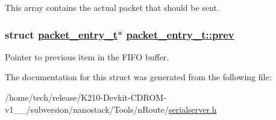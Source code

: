 This array contains the actual packet that should be sent. \hypertarget{structpacket__entry__t_bf2385bedd4ae2af115b923f29c8ec5d}{
\subsubsection[prev]{\setlength{\rightskip}{0pt plus 5cm}struct \hyperlink{structpacket__entry__t}{packet\_\-entry\_\-t}$\ast$ \hyperlink{structpacket__entry__t_bf2385bedd4ae2af115b923f29c8ec5d}{packet\_\-entry\_\-t::prev}}}
\label{structpacket__entry__t_bf2385bedd4ae2af115b923f29c8ec5d}


Pointer to previous item in the FIFO buffer. 

The documentation for this struct was generated from the following file:\begin{CompactItemize}
\item 
/home/tech/release/K210-Devkit-CDROM-v1\_\_/subversion/nanostack/Tools/n\-Route/\hyperlink{serialserver_8h}{serialserver.h}\end{CompactItemize}
